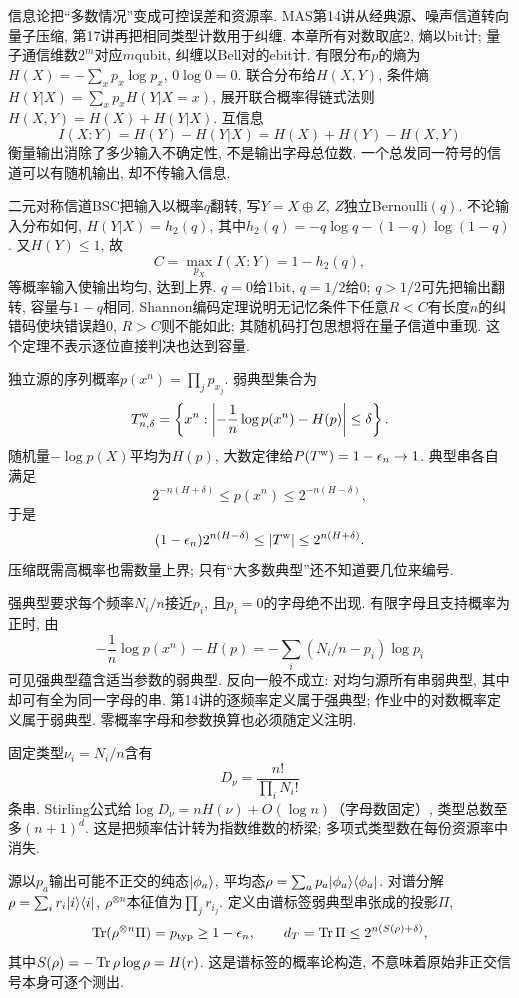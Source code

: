 信息论把“多数情况”变成可控误差和资源率. MAS第14讲从经典源、噪声信道转向量子压缩, 第17讲再把相同类型计数用于纠缠. 本章所有对数取底2, 熵以bit计; 量子通信维数$2^m$对应$m$qubit, 纠缠以Bell对的ebit计.
有限分布$p$的熵为$H(X)=-\sum_xp_x\log p_x$, $0\log0=0$. 联合分布给$H(X,Y)$, 条件熵$H(Y|X)=\sum_xp_xH(Y|X=x)$, 展开联合概率得链式法则$H(X,Y)=H(X)+H(Y|X)$. 互信息
\[I(X:Y)=H(Y)-H(Y|X)=H(X)+H(Y)-H(X,Y)\]
衡量输出消除了多少输入不确定性, 不是输出字母总位数. 一个总发同一符号的信道可以有随机输出, 却不传输入信息.

二元对称信道BSC把输入以概率$q$翻转, 写$Y=X\oplus Z$, $Z$独立Bernoulli$(q)$. 不论输入分布如何, $H(Y|X)=h_2(q)$, 其中$h_2(q)=-q\log q-(1-q)\log(1-q)$. 又$H(Y)\le1$, 故
\[C=\max_{p_X}I(X:Y)=1-h_2(q),\]
等概率输入使输出均匀, 达到上界. $q=0$给1bit, $q=1/2$给0; $q>1/2$可先把输出翻转, 容量与$1-q$相同. Shannon编码定理说明无记忆条件下任意$R<C$有长度$n$的纠错码使块错误趋0, $R>C$则不能如此; 其随机码打包思想将在量子信道中重现. 这个定理不表示逐位直接判决也达到容量.

独立源的序列概率$p(x^n)=\prod_jp_{x_j}$. 弱典型集合为
\[T_{n,\delta}^{\rm w}=\left\{x^n:\left|-\frac1n\log p(x^n)-H(p)\right|\le\delta\right\}.\]
随机量$-\log p(X)$平均为$H(p)$, 大数定律给$P(T^{\rm w})=1-\epsilon_n\to1$. 典型串各自满足
\[2^{-n(H+\delta)}\le p(x^n)\le2^{-n(H-\delta)},\]
于是
\[(1-\epsilon_n)2^{n(H-\delta)}\le |T^{\rm w}|
 \le2^{n(H+\delta)}.\]
压缩既需高概率也需数量上界; 只有“大多数典型”还不知道要几位来编号.

强典型要求每个频率$N_i/n$接近$p_i$, 且$p_i=0$的字母绝不出现. 有限字母且支持概率为正时, 由
\[-\frac1n\log p(x^n)-H(p)
 =-\sum_i(N_i/n-p_i)\log p_i\]
可见强典型蕴含适当参数的弱典型. 反向一般不成立: 对均匀源所有串弱典型, 其中却可有全为同一字母的串. 第14讲的逐频率定义属于强典型; 作业中的对数概率定义属于弱典型. 零概率字母和参数换算也必须随定义注明.

固定类型$\nu_i=N_i/n$含有
\[D_\nu=\frac{n!}{\prod_iN_i!}\]
条串. Stirling公式给$\log D_\nu=nH(\nu)+O(\log n)$（字母数固定）, 类型总数至多$(n+1)^d$. 这是把频率估计转为指数维数的桥梁; 多项式类型数在每份资源率中消失.

源以$p_a$输出可能不正交的纯态$\lvert \phi_a\rangle$, 平均态$\rho=\sum_ap_a\lvert \phi_a\rangle\langle \phi_a\rvert$. 对谱分解$\rho=\sum_ir_i\lvert i\rangle\langle i\rvert$, $\rho^{\otimes n}$本征值为$\prod_jr_{i_j}$. 定义由谱标签弱典型串张成的投影$\Pi$,
\[\operatorname{Tr}(\rho^{\otimes n}\Pi)=p_{\rm typ}\ge1-\epsilon_n,\qquad
 d_T=\operatorname{Tr}\Pi\le2^{n(S(\rho)+\delta)},\]
其中$S(\rho)=-\operatorname{Tr}\rho\log\rho=H(r)$. 这是谱标签的概率论构造, 不意味着原始非正交信号本身可逐个测出.

